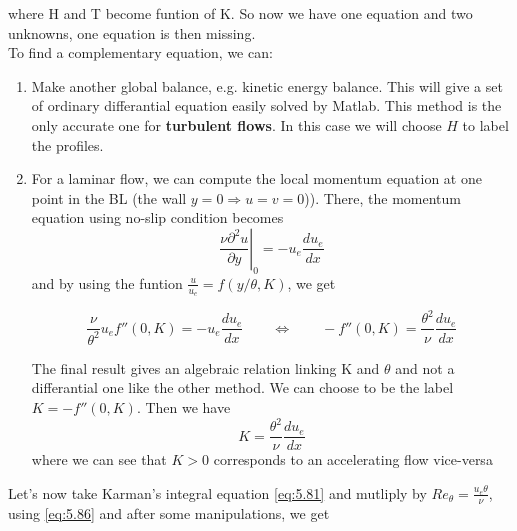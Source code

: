 where H and T become funtion of K. So now we have one equation and two unknowns, one equation is then missing.
\\

To find a complementary equation, we can:
\begin{enumerate}
\item Make another global balance, e.g. kinetic energy balance. This will give a set of ordinary differantial equation easily solved by Matlab. This method is the only accurate one for \textbf{turbulent flows}. In this case we will choose $H$ to label the profiles. 

\item For a laminar flow, we can compute the local momentum equation at one point in the BL (the wall $y=0 \Rightarrow u=v=0$)). There, the momentum equation using no-slip condition becomes 
\begin{equation}
	\left.\frac{\nu  \partial^2 u}{\partial y}\right|_0=-u_e\frac{du_e}{dx}
\end{equation}
and by using the funtion $\frac{u}{u_e} = f(y/\theta , K)$, we get

\begin{equation}
 \frac{\nu}{\theta^2}u_e f''(0,K) =-u_e \frac{d u_e}{d x}\qquad  \Leftrightarrow \qquad  -f''(0,K)=\frac{\theta^2}{\nu} \frac{d u_e}{d x}
\end{equation}

The final result gives an algebraic relation linking K and $\theta$ and not a differantial one like the other method. We can choose to be the label $K=-f''(0,K) $. Then we have 
\begin{equation}
K=\frac{\theta^2}{\nu} \frac{d u_e}{d x}
\end{equation} 
where we can see that $K>0$ corresponds to an accelerating flow vice-versa
\end{enumerate}

Let's now take Karman's integral equation \eqref{eq:5.81} and mutliply by $Re_{ \theta}=\frac{u_e \theta}{\nu}$, using \eqref{eq:5.86} and after some manipulations, we get

\begin{center}
\end{center}

